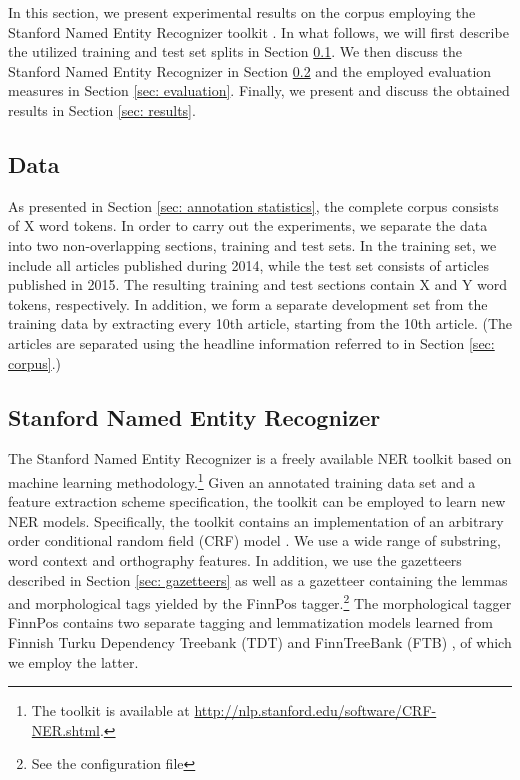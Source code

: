 \documentclass[11pt]{article}
\begin{document}
In this section, we present experimental results on the corpus employing the Stanford Named Entity Recognizer toolkit \citep{finkel2005}. In what follows, we will first describe the utilized training and test set splits in Section \ref{sec: data}. We then discuss the Stanford Named Entity Recognizer in Section \ref{sec: stanford named entity recognizer} and the employed evaluation measures in Section \ref{sec: evaluation}. Finally, we present and discuss the obtained results in Section \ref{sec: results}.


\subsection{Data}
\label{sec: data}

As presented in Section \ref{sec: annotation statistics},  the complete corpus consists of X word tokens. In order to carry out the experiments, we separate the data into two non-overlapping sections, training and test sets.  In the training set, we include all articles published during 2014, while the test set consists of articles published in 2015. The resulting training and test sections contain X and Y word tokens, respectively. In addition, we form a separate development set from the training data by extracting every 10th article, starting from the 10th article. (The articles are separated using the headline information referred to in Section \ref{sec: corpus}.) %


\subsection{Stanford Named Entity Recognizer}
\label{sec: stanford named entity recognizer}

The Stanford Named Entity Recognizer \citep{finkel2005} is a freely available NER toolkit based on machine learning methodology.\footnote{The toolkit is available at \url{http://nlp.stanford.edu/software/CRF-NER.shtml}.} Given an annotated training data set and a feature extraction scheme specification, the toolkit can be employed to learn new NER models. Specifically, the toolkit contains an implementation of an arbitrary order conditional random field (CRF) model \citep{lafferty2001,finkel2005}. We use a wide range of substring, word context and orthography features. In addition, we use the gazetteers described in Section \ref{sec: gazetteers} as well as a gazetteer containing the lemmas and morphological tags yielded by the FinnPos tagger.\footnote{See the configuration file} The morphological tagger FinnPos contains two separate tagging and lemmatization models learned from Finnish Turku Dependency Treebank (TDT) \citep{haverinen2014} and FinnTreeBank (FTB) \citep{voutilainen2011}, of which we employ the latter. 
\end{document}
